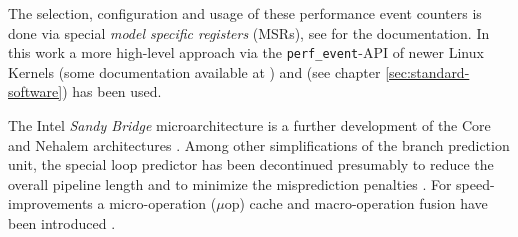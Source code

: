 The selection, configuration and usage of these performance event counters is
done via special \emph{model specific registers} (MSRs), see
\cite{intel2011softdev3b} for the documentation. In this work a more high-level
approach via the \texttt{perf\_event}-API of newer Linux Kernels (some
documentation available at \cite{weaver2011perfevents}) and 
(see chapter \ref{sec:standard-software}) has been used.



The Intel\TReg{} \emph{Sandy Bridge} microarchitecture is a further development
of the Core and Nehalem architectures \cite{fog11}. Among other simplifications
of the branch prediction unit, the special loop predictor has been decontinued
presumably to reduce the overall pipeline length and to minimize the
misprediction penalties \cite{fog11}. For speed-improvements a micro-operation
($\mu$op) cache and macro-operation fusion have been introduced \cite{fog11}.

